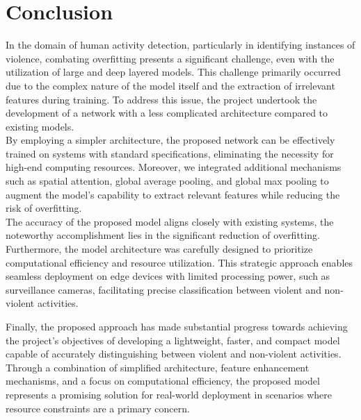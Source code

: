 \chapter{Conclusion}

\setcounter{equation}{0}
\noindent In the domain of human activity detection, particularly in identifying instances of violence, combating overfitting presents a significant challenge, even with the utilization of large and deep layered models\cite{overfit}. This challenge primarily occurred due to the complex nature of the model itself and the extraction of irrelevant features during training. To address this issue, the project undertook the development of a network with a less complicated architecture compared to existing models.\\
\noindent By employing a simpler architecture, the proposed network can be effectively trained on systems with standard specifications, eliminating the necessity for high-end computing resources. Moreover, we integrated additional mechanisms such as spatial attention, global average pooling, and global max pooling to augment the model's capability to extract relevant features while reducing the risk of overfitting.\\
\noindent The accuracy of the proposed model aligns closely with existing systems, the noteworthy accomplishment lies in the significant reduction of overfitting. Furthermore, the model architecture was carefully designed to prioritize computational efficiency and resource utilization\cite{comp_efficiency}. This strategic approach enables seamless deployment on edge devices with limited processing power, such as surveillance cameras, facilitating precise classification between violent and non-violent activities.

\clearpage

\noindent Finally, the proposed approach has made substantial progress towards achieving the project's objectives of developing a lightweight, faster, and compact model capable of accurately distinguishing between violent and non-violent activities. Through a combination of simplified architecture, feature enhancement mechanisms, and a focus on computational efficiency, the proposed model represents a promising solution for real-world deployment in scenarios where resource constraints are a primary concern.
 

